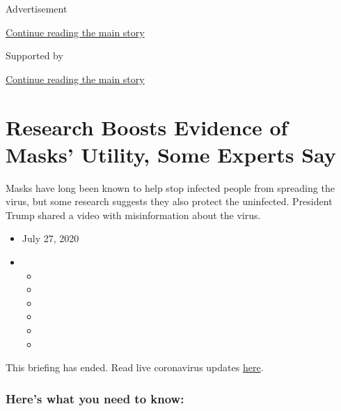 Advertisement

\protect\hyperlink{after-top}{Continue reading the main story}

Supported by

\protect\hyperlink{after-sponsor}{Continue reading the main story}

\hypertarget{research-boosts-evidence-of-masks-utility-some-experts-say}{%
\section{Research Boosts Evidence of Masks' Utility, Some Experts
Say}\label{research-boosts-evidence-of-masks-utility-some-experts-say}}

Masks have long been known to help stop infected people from spreading
the virus, but some research suggests they also protect the uninfected.
President Trump shared a video with misinformation about the virus.

\begin{itemize}
\item
  July 27, 2020
\item
  \begin{itemize}
  \item
  \item
  \item
  \item
  \item
  \item
  \end{itemize}
\end{itemize}

This briefing has ended. Read live coronavirus updates
\href{https://www.nytimes3xbfgragh.onion/2020/07/28/world/coronavirus-covid-19.html}{here}.

\hypertarget{heres-what-you-need-to-know}{%
\subsubsection{Here's what you need to
know:}\label{heres-what-you-need-to-know}}

